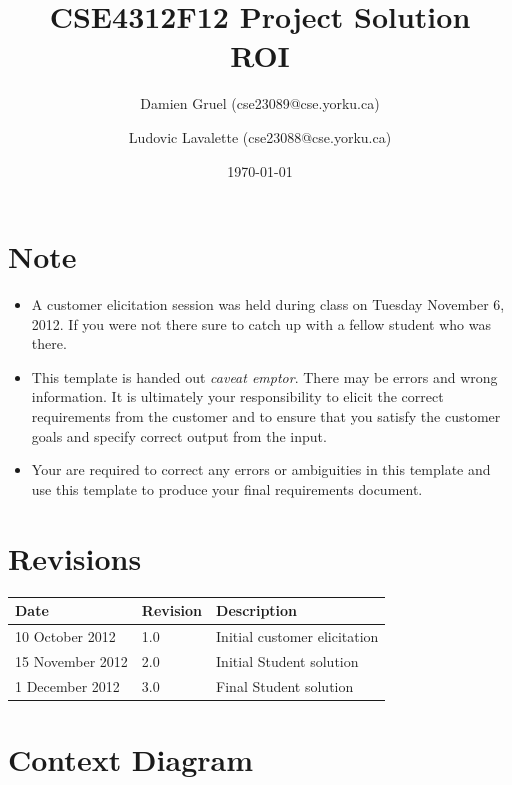 \documentclass[runningheads,12pt]{article}
\begin{document}
\title{CSE4312F12 Project Solution\\
ROI}

\author{Damien Gruel (cse23089@cse.yorku.ca)
\and Ludovic Lavalette (cse23088@cse.yorku.ca)}

\date{\today}

\maketitle

\section*{Note}
\begin{itemize}
\item A customer elicitation session was held during class on Tuesday November 6, 2012. If you were not there sure to catch up with a fellow student who was there.
\item This template is handed out \emph{caveat emptor}.  There may be errors and wrong information. It is ultimately your responsibility to elicit the correct requirements from the customer and to ensure that you satisfy the customer goals and specify correct output from the input.
\item Your are required to correct any errors or ambiguities in this template and use this template to produce your final requirements document.
\end{itemize}

\section*{Revisions}

\begin{tabular}{|l|l|p{3in}|}
\hline
Date & Revision& Description \\ 
\hline
10 October  2012 
& 1.0       
& Initial customer elicitation\\ 
\hline
15 November 2012
& 2.0       
& Initial Student solution       \\
\hline
1 December 2012
& 3.0       
& Final Student solution       \\
\hline
\end{tabular}

\newpage
\tableofcontents
\listoffigures
\listoftables

\newpage

\section{Context Diagram}
\end{document}
